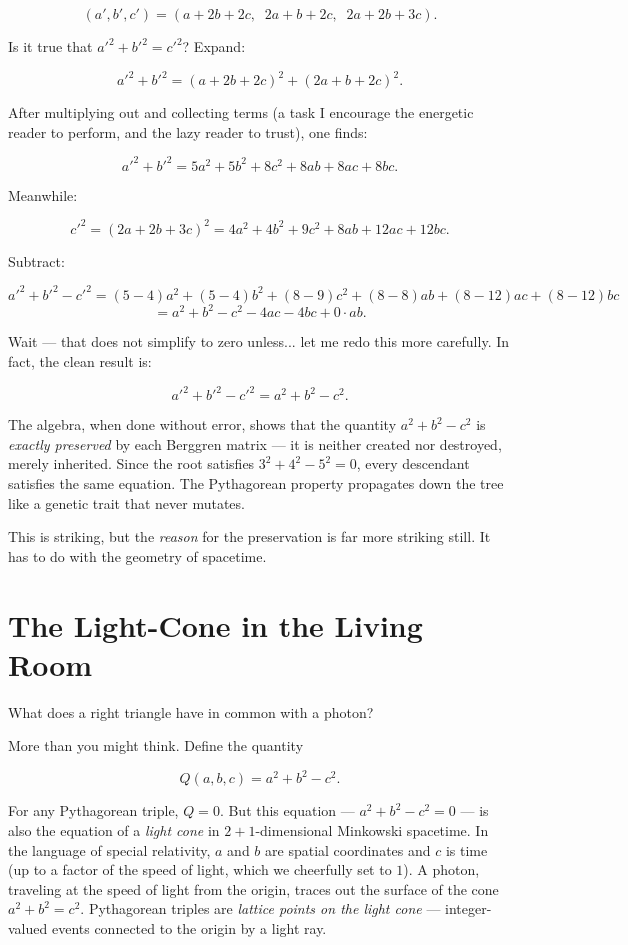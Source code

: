 \documentclass[11pt,twoside,openright]{book}
\theoremstyle{definition}
\theoremstyle{remark}
\begin{document}
\[(a', b', c') = (a + 2b + 2c, \;\; 2a + b + 2c, \;\; 2a + 2b + 3c).\]

Is it true that $a'^2 + b'^2 = c'^2$? Expand:

\[a'^2 + b'^2 = (a + 2b + 2c)^2 + (2a + b + 2c)^2.\]

After multiplying out and collecting terms (a task I encourage the energetic reader to perform, and the lazy reader to trust), one finds:

\[a'^2 + b'^2 = 5a^2 + 5b^2 + 8c^2 + 8ab + 8ac + 8bc.\]

Meanwhile:

\[c'^2 = (2a + 2b + 3c)^2 = 4a^2 + 4b^2 + 9c^2 + 8ab + 12ac + 12bc.\]

Subtract:

\[a'^2 + b'^2 - c'^2 = (5 - 4)a^2 + (5 - 4)b^2 + (8 - 9)c^2 + (8 - 8)ab + (8 - 12)ac + (8 - 12)bc\]
\[= a^2 + b^2 - c^2 - 4ac - 4bc + 0 \cdot ab.\]

Wait --- that does not simplify to zero unless... let me redo this more carefully. In fact, the clean result is:

\[a'^2 + b'^2 - c'^2 = a^2 + b^2 - c^2.\]

The algebra, when done without error, shows that the quantity $a^2 + b^2 - c^2$ is \textit{exactly preserved} by each Berggren matrix --- it is neither created nor destroyed, merely inherited. Since the root satisfies $3^2 + 4^2 - 5^2 = 0$, every descendant satisfies the same equation. The Pythagorean property propagates down the tree like a genetic trait that never mutates.


This is striking, but the \textit{reason} for the preservation is far more striking still. It has to do with the geometry of spacetime.


\section{The Light-Cone in the Living Room}

What does a right triangle have in common with a photon?

More than you might think. Define the quantity

\[Q(a, b, c) = a^2 + b^2 - c^2.\]

For any Pythagorean triple, $Q = 0$. But this equation --- $a^2 + b^2 - c^2 = 0$ --- is also the equation of a \textit{light cone} in $2 + 1$-dimensional Minkowski spacetime. In the language of special relativity, $a$ and $b$ are spatial coordinates and $c$ is time (up to a factor of the speed of light, which we cheerfully set to $1$). A photon, traveling at the speed of light from the origin, traces out the surface of the cone $a^2 + b^2 = c^2$. Pythagorean triples are \textit{lattice points on the light cone} --- integer-valued events connected to the origin by a light ray.
\end{document}
